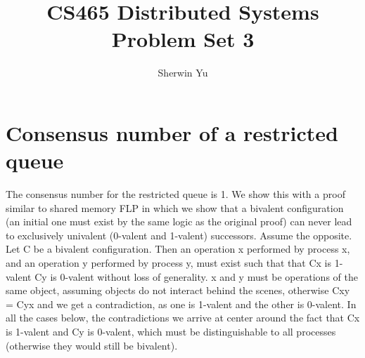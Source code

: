 \documentclass{article}
\begin{document}
\title{CS465 Distributed Systems Problem Set 3}
\author{Sherwin Yu}
\maketitle


\section{Consensus number of a restricted queue}
\label{problem1.1}
The consensus number for the restricted queue is 1. We show this with a proof similar to shared memory FLP in which we show that a bivalent configuration (an initial one must exist
by the same logic as the original proof) can never lead to exclusively univalent (0-valent and 1-valent) successors.
Assume the opposite. Let C be a bivalent configuration. Then an operation x performed by process x, and an operation y performed by process y, must exist such that that
Cx is 1-valent Cy is 0-valent without loss of generality.
x and y must be operations of the same object, assuming objects do not interact behind the scenes, otherwise Cxy = Cyx and we get a contradiction, as one is 1-valent and
the other is 0-valent.
In all the cases below, the contradictions we arrive at center around the fact that Cx is 1-valent and Cy is 0-valent, which must be distinguishable to all processes (otherwise they would still be bivalent). 
\end{document}
